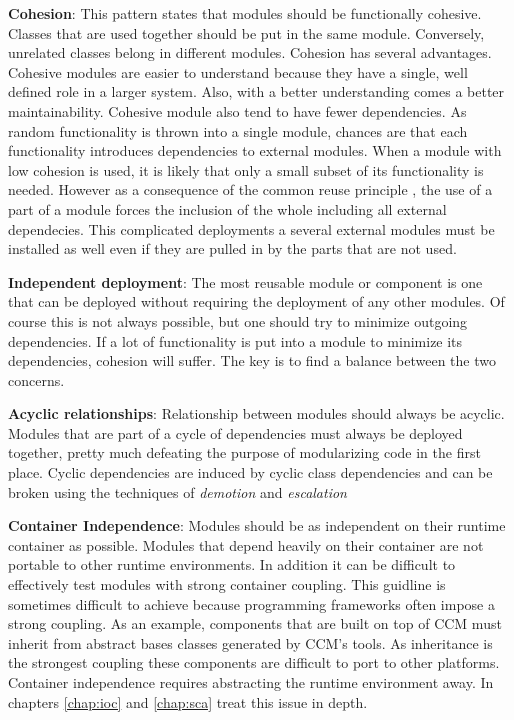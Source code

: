 \textbf{Cohesion}:
This pattern states that modules should be functionally cohesive. Classes that are used together should
be put in the same module. Conversely, unrelated classes belong in different modules. Cohesion has several
advantages. Cohesive modules are easier to understand because they have a single, well defined role in a
larger system. Also, with a better understanding comes a better maintainability. Cohesive module also tend
to have fewer dependencies. As random functionality is thrown into a single module, chances are that each
functionality introduces dependencies to external modules. When a module with low cohesion is used, it is
likely that only a small subset of its functionality is needed. However as a consequence of the common reuse
principle \cite{Martin}, the use of a part of a module forces the inclusion of the whole including all
external dependecies. This complicated deployments a several external modules must be installed as well
even if they are pulled in by the parts that are not used.

\textbf{Independent deployment}:
The most reusable module or component is one that can be deployed without requiring the deployment of any other
modules. Of course this is not always possible, but one should try to minimize outgoing dependencies.
If a lot of functionality is put into a module to minimize its dependencies, cohesion will suffer.
The key is to find a balance between the two concerns.

\textbf{Acyclic relationships}:
Relationship between modules should always be acyclic. Modules that are part of a cycle of dependencies
must always be deployed together, pretty much defeating the purpose of modularizing code in the first place.
Cyclic dependencies are induced by cyclic class dependencies and can be broken using the techniques of
\emph{demotion} and \emph{escalation} \cite{Lakos}

\textbf{Container Independence}:
Modules should be as independent on their runtime container as possible. Modules that depend heavily on their
container are not portable to other runtime environments. In addition it can be difficult to effectively
test modules with strong container coupling. This guidline is sometimes difficult to achieve because
programming frameworks often impose a strong coupling. As an example, components that are built on top
of CCM must inherit from abstract bases classes generated by CCM's tools. As inheritance is the strongest coupling
these components are difficult to port to other platforms. Container independence requires abstracting the
runtime environment away. In chapters \ref{chap:ioc} and \ref{chap:sca} treat this issue in depth.

